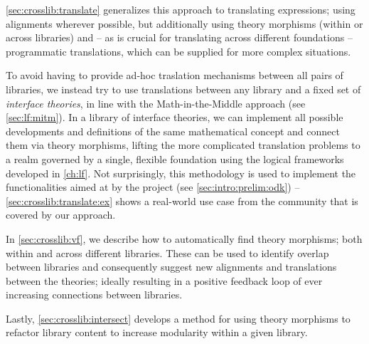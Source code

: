 \autoref{sec:crosslib:translate} generalizes this approach to translating expressions; using alignments wherever possible, but additionally using theory morphisms (within or across libraries) and -- as is crucial for translating across different foundations -- programmatic translations, which can be supplied for more complex situations. 

To avoid having to provide ad-hoc traslation mechanisms between all pairs of libraries, we instead try to use translations between any library and a fixed set of \emph{interface theories}, in line with the Math-in-the-Middle approach (see \autoref{sec:lf:mitm}). In a library of interface theories, we can implement all possible developments and definitions of the same mathematical concept and connect them via theory morphisms, lifting the more complicated translation problems to a realm governed by a single, flexible foundation using the logical frameworks developed in \autoref{ch:lf}. Not surprisingly, this methodology is used to implement the functionalities aimed at by the \ODK project (see \autoref{sec:intro:prelim:odk}) -- \autoref{sec:crosslib:translate:ex} shows a real-world use case from the \ODK community that is covered by our approach.

In \autoref{sec:crosslib:vf}, we describe how to automatically find theory morphisms; both within and across different libraries. These can be used to identify overlap between libraries and consequently suggest new alignments and translations between the theories; ideally resulting in a positive feedback loop of ever increasing connections between libraries.

Lastly, \autoref{sec:crosslib:intersect} develops a method for using theory morphisms to refactor library content to increase modularity within a given library.